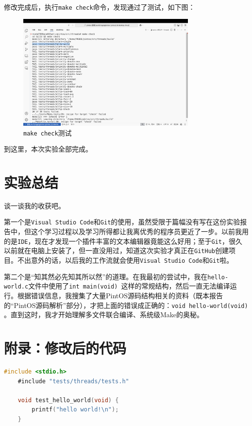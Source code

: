 \documentclass{article}
\begin{document}
修改完成后，执行\texttt{make check}命令，发现通过了测试，如下图：

\begin{figure}[H]
	\centering
	\includegraphics[width=0.8\textwidth]{img/makecheck.png}
	\caption{\texttt{make check}测试}
\end{figure}

到这里，本次实验全部完成。

\normalsize

\section{实验总结}

谈一谈我的收获吧。

第一个是\texttt{Visual Studio Code}和\texttt{Git}的使用，虽然受限于篇幅没有写在这份实验报告中，但这个学习过程以及学习所得都让我离优秀的程序员更近了一步。以前我用的是\texttt{IDE}，现在才发现一个插件丰富的文本编辑器竟能这么好用；至于\texttt{Git}，很久以前就在电脑上安装了，但一直没用过，知道这次实验才真正在\texttt{GitHub}创建项目。不出意外的话，以后我的工作流就会使用\texttt{Visual Studio Code}和\texttt{Git}啦。

第二个是“知其然必先知其所以然”的道理。在我最初的尝试中，我在\texttt{hello-world.c}文件中使用了\texttt{int main(void) {}}这样的常规结构，然后一直无法编译运行。根据错误信息，我搜集了大量PintOS源码结构相关的资料（既本报告的“PintOS源码解析”部分），才把上面的错误成正确的：\texttt{void hello-world(void) {}}。直到这时，我才开始理解多文件联合编译、系统级Make的奥秘。

\normalsize

\section{附录：修改后的代码}

\begin{lstlisting}[language=C, title=\texttt{hello-world.c}]
	#include <stdio.h>
	#include "tests/threads/tests.h"
	
	void test_hello_world(void) {
		printf("hello world!\n");
	}
\end{lstlisting}
\end{document}
